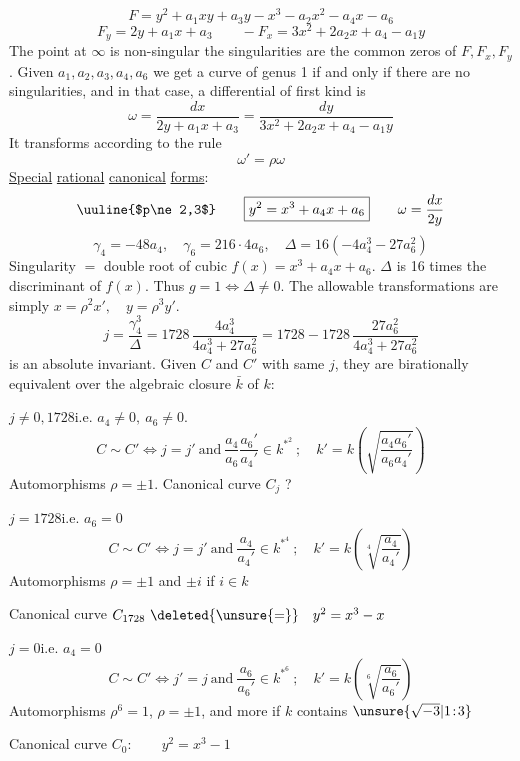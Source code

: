 \[
F=y^2+a_1xy+a_3y-x^3-a_2x^2-a_4x-a_6
\]
\[
F_y=2y+a_1x+a_3\qquad -F_x=3x^2+2a_2x+a_4-a_1y
\]
The point at $\infty$ is non-singular  the singularities are the common zeros of $F,F_x,F_y$. Given $a_1,a_2,a_3,a_4,a_6$ we get a curve of genus 1 if and only if there are no singularities, and in that case, a differential of first kind is
\[
\omega=\frac{dx}{2y+a_1x+a_3}=\frac{dy}{3x^2+2a_2x+a_4-a_1y}
\]
It transforms according to the rule
\[
\omega'=\rho\omega
\]
\uline{Special} \uline{rational} \uline{canonical} \uline{forms}:
\[
\text{\uuline{$p\ne2,3$}}\qquad
\boxed{y^2=x^3+a_4x+a_6}\qquad\omega=\frac{dx}{2y}
\]
\[
\gamma_4=-48a_4,\quad\gamma_6=216\cdot4a_6,\quad
\Delta=16(-4a_4^3-27a_6^2)
\]
Singularity $=$ double root of cubic $f(x)=x^3+a_4x+a_6$. $\Delta$ is 16 times the discriminant of $f(x)$. Thus $g=1\Longleftrightarrow\Delta\ne0$. The allowable transformations are simply $x=\rho^2x',\quad y=\rho^3y'$.
\[
j=\frac{\gamma_4^3}{\Delta}
=1728\,\frac{4a_4^3}{4a_4^3+27a_6^2}
=1728-1728\,\frac{27a_6^2}{4a_4^3+27a_6^2}
\]
is an absolute invariant. Given $C$ and $C'$ with same $j$, they are birationally equivalent over the algebraic closure $\bar{k}$ of $k$:

 \quad $j\ne0,1728$\qquad i.e. $a_4\ne0,\ a_6\ne0$.
\[
C\sim C'\Longleftrightarrow j=j'\ \text{and}\ 
\frac{a_4}{a_6}\frac{a_6'}{a_4'}\in k^{*^{2}}\ ;\quad
k'=k\left(\sqrt{\frac{a_4a_6'}{a_6a_4'}}\right)
\]
Automorphisms \quad $\rho=\pm1$. \qquad Canonical curve $C_j$ ?

 \quad $j=1728$\qquad i.e. $a_6=0$
\[
C\sim C'\Longleftrightarrow j=j'\ \text{and}\ 
\frac{a_4}{a_4'}\in k^{*^{4}}\ ;\quad
k'=k\left(\sqrt[4]{\frac{a_4}{a_4'}}\right)
\]
Automorphisms \quad $\rho=\pm1$ and $\pm i$ if $i\in k$

Canonical curve $C_{1728}\ \deleted{\unsure{=}}\quad y^2=x^3-x$

\uuline{Case 3} \quad $j=0$\qquad i.e. $a_4=0$
\[
C\sim C'\Longleftrightarrow j'=j\ \text{and}\ 
\frac{a_6}{a_6'}\in k^{*^{6}}\ ;\quad
k'=k\left(\sqrt[6]{\frac{a_6}{a_6'}}\right)
\]
Automorphisms \quad $\rho^6=1$, \quad $\rho=\pm1$, \quad and more if $k$ contains $\unsure{\sqrt{-3}|1\!:\!3}$

Canonical curve $C_0:\qquad y^2=x^3-1$

